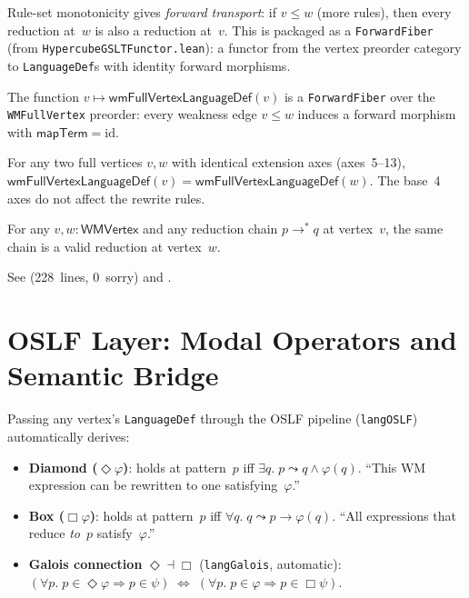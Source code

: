 \documentclass[11pt,openany]{report}
\begin{document}
\noindent
Rule-set monotonicity gives \emph{forward transport}: if $v \le w$
(more rules), then every reduction at~$w$ is also a reduction at~$v$.
This is packaged as a \texttt{ForwardFiber} (from
\texttt{HypercubeGSLTFunctor.lean}): a functor from the vertex preorder
category to \texttt{LanguageDef}s with identity forward morphisms.

\begin{theorem}
The function $v \mapsto \mathsf{wmFullVertexLanguageDef}(v)$ is a
\texttt{ForwardFiber} over the \texttt{WMFullVertex} preorder:
every weakness edge $v \le w$ induces a forward morphism with
$\mathsf{mapTerm} = \mathrm{id}$.
\end{theorem}

\begin{theorem}
For any two full vertices $v, w$ with identical extension axes (axes~5--13),
$\mathsf{wmFullVertexLanguageDef}(v) = \mathsf{wmFullVertexLanguageDef}(w)$.
The base~4 axes do not affect the rewrite rules.
\end{theorem}

\begin{theorem}
For any $v, w : \mathsf{WMVertex}$ and any reduction chain
$p \to^* q$ at vertex~$v$, the same chain is a valid reduction at
vertex~$w$.
\end{theorem}

\noindent
See 
(228~lines, 0~sorry) and
.

\section{OSLF Layer: Modal Operators and Semantic Bridge}
\label{sec:wm-oslf-layer}
\label{sec:wm-oslf}
\label{sec:wm-gslt-bridge}

Passing any vertex's \texttt{LanguageDef} through the OSLF pipeline
(\texttt{langOSLF}) automatically derives:

\begin{itemize}
\item \textbf{Diamond ($\Diamond\varphi$)}: holds at pattern~$p$ iff
  $\exists q.\; p \leadsto q \wedge \varphi(q)$.
  ``This WM expression can be rewritten to one satisfying~$\varphi$.''

\item \textbf{Box ($\Box\varphi$)}: holds at pattern~$p$ iff
  $\forall q.\; q \leadsto p \to \varphi(q)$.
  ``All expressions that reduce \emph{to}~$p$ satisfy~$\varphi$.''

\item \textbf{Galois connection} $\Diamond \dashv \Box$
  (\texttt{langGalois}, automatic):
  $(\forall p.\; p \in \Diamond\varphi \Rightarrow p \in \psi)
  \;\Leftrightarrow\;
  (\forall p.\; p \in \varphi \Rightarrow p \in \Box\psi)$.
\end{itemize}
\end{document}
